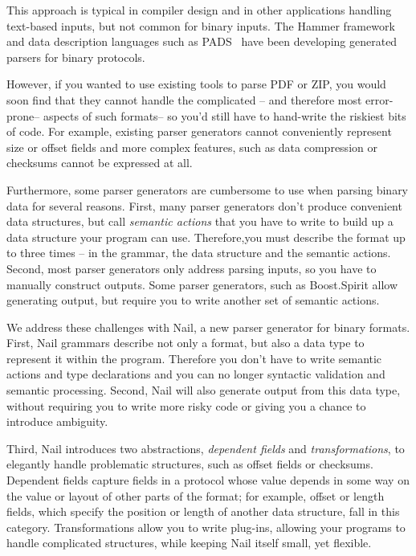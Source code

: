 This approach is typical in compiler design and in other applications handling text-based inputs, but not
common for binary inputs. The Hammer framework~\cite{hammer-parser} and data description languages such as
PADS~\cite{Fisher:2005:PDL:1064978.1065046} have been developing generated parsers for binary protocols.

However, if you wanted to use existing tools to parse PDF
or ZIP, you would soon find that they cannot handle the complicated -- and therefore most
error-prone-- aspects of such formats-- so you'd still have to
hand-write the riskiest bits of code. For example, existing parser generators cannot conveniently represent size or offset fields and more complex features, such as data compression or checksums cannot be expressed at all.

Furthermore, some parser generators are cumbersome to use when parsing binary data for several
reasons. First, many parser generators don't produce convenient data structures, but call
\emph{semantic actions} that you have to write to build up a data structure your program can use. Therefore,you must
describe the format up to three times -- in the grammar, the data structure and the semantic
actions. Second, most parser generators only address parsing inputs, so you have to manually
construct outputs. Some parser generators, such as 
Boost.Spirit  allow generating output, but require you to write another set of semantic actions.


We address these challenges with Nail, a new parser generator for binary formats.
First, Nail grammars describe not only a format, but also a data type to represent it within the program.
Therefore you don't have to write semantic actions and type declarations and you can no longer syntactic validation and semantic processing.
Second, Nail will also generate output from this data type, without requiring you
to write more risky code or giving you a chance to introduce ambiguity.

Third,  Nail introduces two abstractions, \emph{dependent fields} and
\emph{transformations}, to elegantly handle problematic structures,
such as offset fields or checksums.  Dependent fields capture fields
in a protocol whose value depends in some way on the value or layout
of other parts of the format; for example, offset or length fields,
which specify the position or length of another data structure, fall
in this category.  Transformations allow you to write plug-ins, allowing your programs to handle complicated structures, while
keeping Nail itself small, yet flexible. 

